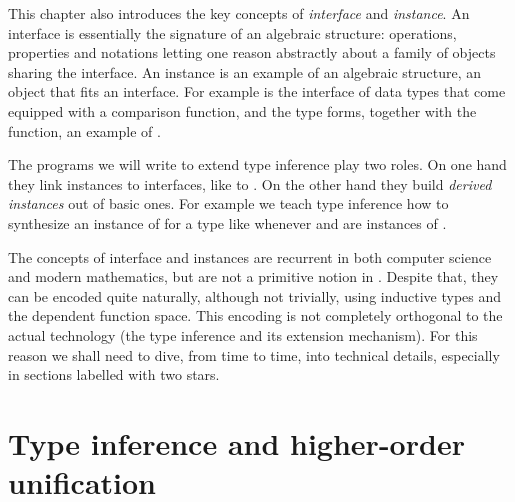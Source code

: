 This chapter also introduces the key concepts of \emph{interface}
and \emph{instance}.  An interface is essentially the signature
of an algebraic structure: operations, properties and notations
letting one reason abstractly about a family of objects sharing
the interface.
An instance is an example of an algebraic structure,
an object that fits an interface.
For example  is the interface of
data types that come equipped with a comparison function, and
the type  forms, together with the  function, an
example of .

The programs we will write to
extend type inference play two roles.  On one hand they link
instances to interfaces, like  to .
On the other hand they build \emph{derived
instances} out of basic ones.  For example we teach type inference
how to synthesize an instance of  for a type like
 whenever  and  are instances of .

The concepts of interface and instances are recurrent in
both computer science and modern mathematics, but are not a primitive
notion in \Coq{}.  Despite that, they can be encoded quite naturally,
although not trivially, using inductive types and the dependent function
space.   This encoding is not completely orthogonal to the
actual technology (the type inference and its extension mechanism).
For this reason we shall need to dive, from time to time, into
technical details, especially in sections labelled with two stars.

\section{Type inference and higher-order unification}\label{sec:hounif}

